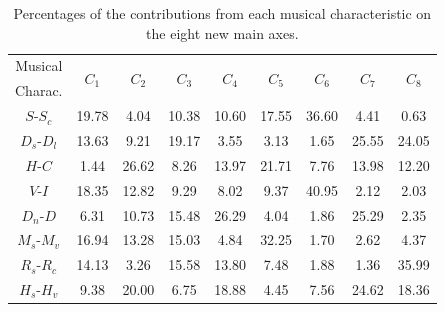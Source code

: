 \documentclass[
 aip,
 jmp,
 amsmath,amssymb,
 reprint,
]{revtex4-1}
\begin{document}
\begin{table}[ht]
\caption{\label{tab:Deviatesmus}Percentages of
the contributions from each musical characteristic on the eight
new main axes.}
\begin{tabular}{|c||c|c|c|c|c|c|c|c|}
\hline
Musical         & \multirow{2}{*}{$C_1$} & \multirow{2}{*}{$C_2$} & \multirow{2}{*}{$C_3$} & \multirow{2}{*}{$C_4$} & \multirow{2}{*}{$C_5$} & \multirow{2}{*}{$C_6$} & \multirow{2}{*}{$C_7$} & \multirow{2}{*}{$C_8$}\\
Charac. & & & & & & & & \\
\hline
 $S$-$S_c$              &  19.78  &   4.04  & 10.38 & 10.60 &  17.55  &  36.60  &  4.41 &  0.63 \\
 $D_s$-$D_l$            &  13.63  &   9.21  & 19.17 &  3.55 &   3.13  &   1.65  & 25.55 & 24.05 \\
 $H$-$C$                &   1.44  &  26.62  & 8.26 & 13.97 &  21.71  &   7.76  & 13.98 & 12.20 \\
 $V$-$I$                &  18.35  &  12.82  & 9.29 &  8.02 &   9.37  &  40.95  &  2.12 &  2.03 \\
 $D_n$-$D$              &   6.31  &  10.73  & 15.48 & 26.29 &  4.04  &   1.86  & 25.29 &  2.35 \\
 $M_s$-$M_v$            &  16.94  &  13.28  & 15.03 &  4.84 &  32.25  &  1.70  &  2.62 &  4.37 \\
 $R_s$-$R_c$            &  14.13  &   3.26  & 15.58 & 13.80 &   7.48  &  1.88  &  1.36 & 35.99 \\
 $H_s$-$H_v$            &   9.38  &  20.00  &  6.75 & 18.88 &   4.45  &  7.56  & 24.62 & 18.36 \\
\hline
\end{tabular}
\end{table}
\end{document}
